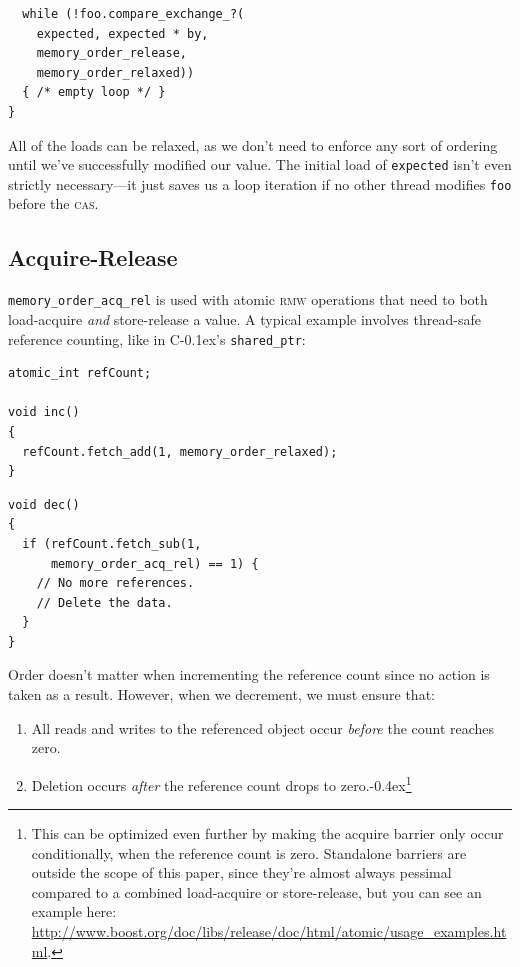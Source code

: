 \documentclass[fontsize=10pt, numbers=endperiod]{scrartcl}
\newcommand{\codesize}{\fontsize{10pt}{12pt}}
\newcommand{\punckern}{\kern-0.4ex}
\newcommand{\cpp}[1]{C\kern-0.1ex\raisebox{0.15ex}{\texttt{++}}{\addfontfeature{Numbers=LowercaseOff}#1}}
\newenvironment{colfigure}
  {\par\vspace{1\baselineskip minus 0.5\baselineskip}\noindent\minipage{\linewidth}}
  {\endminipage\vspace*{1\baselineskip minus 0.7\baselineskip}}
\begin{document}
\begin{multicols*}{2}
\begin{colfigure}
\begin{verbatim}
  while (!foo.compare_exchange_?(
    expected, expected * by,
    memory_order_release,
    memory_order_relaxed))
  { /* empty loop */ }
}
\end{verbatim}
\end{colfigure}
All of the loads can be relaxed, as we don't need to enforce any sort of ordering
until we've successfully modified our value.
The initial load of \texttt{expected} isn't even strictly necessary---it just
saves us a loop iteration if no other thread modifies \texttt{foo} before the
\textsc{cas}.

\subsection{Acquire-Release}

\texttt{memory\_order\_acq\_rel} is used with atomic \textsc{rmw} operations
that need to both load-acquire \emph{and} store-release a value.
A typical example involves thread-safe reference counting,
like in \cpp{}'s \texttt{shared_ptr}:
\begin{colfigure}
\begin{verbatim}
atomic_int refCount;

void inc()
{
  refCount.fetch_add(1, memory_order_relaxed);
}
\end{verbatim}
\end{colfigure}
\begin{colfigure}
\begin{verbatim}
void dec()
{
  if (refCount.fetch_sub(1,
      memory_order_acq_rel) == 1) {
    // No more references.
    // Delete the data.
  }
}
\end{verbatim}
\end{colfigure}

Order doesn't matter when incrementing the reference
count since no action is taken as a result.
However, when we decrement, we must ensure that:
\begin{enumerate}
\item All reads and writes to the referenced object occur
\emph{before} the count reaches zero.
\item Deletion occurs \emph{after} the reference count drops to
    zero.\punckern\footnote{This can be optimized even further by
    making the acquire barrier only occur conditionally, when the reference
    count is zero.
    Standalone barriers are outside the scope of this paper,
    since they're almost always pessimal compared to a combined load-acquire
    or store-release, but you can see an example here:
    \url{http://www.boost.org/doc/libs/release/doc/html/atomic/usage\_examples.html}.}
\end{enumerate}


\end{multicols*}
\end{document}
